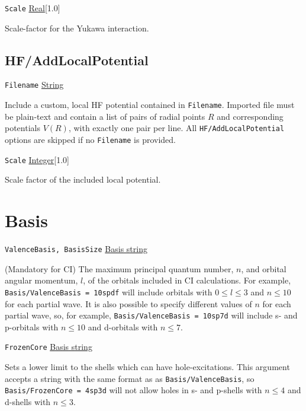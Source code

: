 \documentclass{report}
\begin{document}
\texttt{Scale} \uline{Real}[1.0]
\begin{adjustwidth}{1cm}{}
Scale-factor for the Yukawa interaction.
\end{adjustwidth}

\subsection{HF/AddLocalPotential}

\texttt{Filename} \uline{String}
\begin{adjustwidth}{1cm}{}
Include a custom, local HF potential contained in \texttt{Filename}. Imported file must be plain-text
and contain a list of pairs of radial points $R$ and corresponding potentials $V(R)$, with exactly one
pair per line. All \texttt{HF/AddLocalPotential} options are skipped if no \texttt{Filename} is provided.
\end{adjustwidth}

\texttt{Scale} \uline{Integer}[1.0]
\begin{adjustwidth}{1cm}{}
Scale factor of the included local potential.
\end{adjustwidth}

\section{Basis}

\texttt{ValenceBasis, BasisSize} \uline{Basis string}
\begin{adjustwidth}{1cm}{}
(Mandatory for CI) The maximum principal quantum number, $n$, and orbital angular momentum, $l$, of
the orbitals included in CI calculations. For example, 
\texttt{Basis/ValenceBasis = 10spdf} will include orbitals with $0 \leq l \leq 3$ and $n \leq 10$ for
each partial wave. It is also possible to specify different values of $n$ for each partial wave, so, for
example, \texttt{Basis/ValenceBasis = 10sp7d} will include s- and p-orbitals with $n \leq 10$ and
d-orbitals with $n \leq 7$.
\end{adjustwidth}

\texttt{FrozenCore} \uline{Basis string}
\begin{adjustwidth}{1cm}{}
Sets a lower limit to the shells which can have hole-excitations. This argument accepts a string with
the same format as as \texttt{Basis/ValenceBasis}, so \texttt{Basis/FrozenCore = 4sp3d} will not allow 
holes in s- and p-shells with $n \leq 4$ and d-shells with $n \leq 3$.
\end{adjustwidth}
\end{document}
